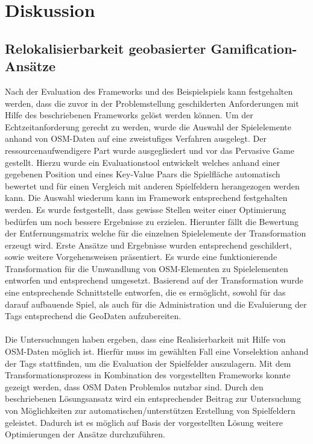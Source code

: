 \chapter{Diskussion}
\label{sec:S7_Diskussion}

\section{Relokalisierbarkeit geobasierter Gamification-Ansätze}

Nach der Evaluation des Frameworks und des Beispielspiels kann festgehalten werden, dass die zuvor in der Problemstellung geschilderten Anforderungen mit Hilfe des beschriebenen Frameworks gelöst werden können. Um der Echtzeitanforderung gerecht zu werden, wurde die Auswahl der Spielelemente anhand von OSM-Daten auf eine zweistufiges Verfahren ausgelegt. Der ressourcenaufwendigere Part wurde ausgegliedert und vor das Pervasive Game gestellt. Hierzu wurde ein Evaluationstool entwickelt welches anhand einer gegebenen Position und eines Key-Value Paars die Spielfläche automatisch bewertet und für einen Vergleich mit anderen Spielfeldern herangezogen werden kann.
Die Auswahl wiederum kann im Framework entsprechend festgehalten werden. Es wurde festgestellt, dass gewisse Stellen weiter einer Optimierung bedürfen um noch bessere Ergebnisse zu erzielen. Hierunter fällt die Bewertung der Entfernungsmatrix welche für die einzelnen Spielelemente der Transformation erzeugt wird. Erste Ansätze und Ergebnisse wurden entsprechend geschildert, sowie weitere Vorgehensweisen präsentiert.
Es wurde eine funktionierende Transformation für die Umwandlung von OSM-Elementen zu Spielelementen entworfen und entsprechend umgesetzt.
Basierend auf der Transformation wurde eine entsprechende Schnittstelle entworfen, die es ermöglicht, sowohl für das darauf aufbauende Spiel, als auch für die Administration und die Evaluierung der Tags entsprechend die GeoDaten aufzubereiten.
\\\\
Die Untersuchungen haben ergeben, dass eine Realisierbarkeit mit Hilfe von OSM-Daten möglich ist. Hierfür muss im gewählten Fall eine Vorselektion anhand der Tags stattfinden, um die Evaluation der Spielfelder auszulagern. Mit dem Transformationsprozess in Kombination des vorgestellten Frameworks konnte gezeigt werden, dass OSM Daten Problemlos nutzbar sind. Durch den beschriebenen Lösungsansatz wird ein entsprechender Beitrag zur Untersuchung von Möglichkeiten zur automatischen/unterstützen Erstellung von Spielfeldern geleistet. Dadurch ist es möglich auf Basis der vorgestellten Lösung weitere Optimierungen der Ansätze durchzuführen. 

